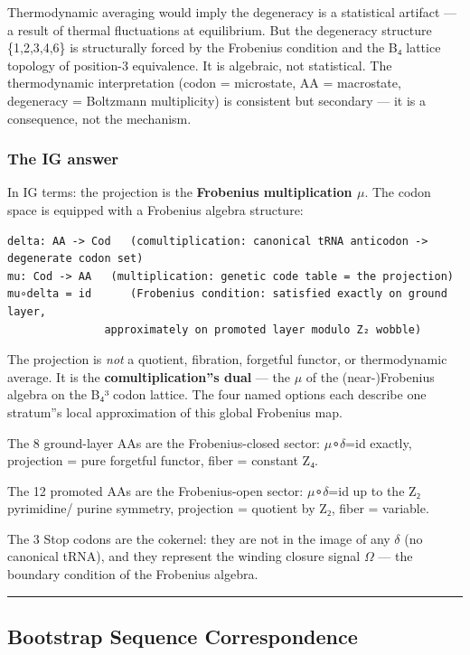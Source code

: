 \documentclass[12pt,a4paper]{article}
\begin{document}
Thermodynamic averaging would imply the degeneracy is a statistical artifact ---
a result of thermal fluctuations at equilibrium. But the degeneracy structure
\{1,2,3,4,6\} is structurally forced by the Frobenius condition and the B₄ lattice
topology of position-3 equivalence. It is algebraic, not statistical. The
thermodynamic interpretation (codon = microstate, AA = macrostate, degeneracy =
Boltzmann multiplicity) is consistent but secondary --- it is a consequence, not
the mechanism.

\subsubsection{The IG answer}

In IG terms: the projection is the \textbf{Frobenius multiplication $\mu$}. The codon space
is equipped with a Frobenius algebra structure:

\begin{lstlisting}
delta: AA -> Cod   (comultiplication: canonical tRNA anticodon -> degenerate codon set)
mu: Cod -> AA   (multiplication: genetic code table = the projection)
mu∘delta = id      (Frobenius condition: satisfied exactly on ground layer,
               approximately on promoted layer modulo Z₂ wobble)
\end{lstlisting}

The projection is \emph{not} a quotient, fibration, forgetful functor, or thermodynamic
average. It is the \textbf{comultiplication''s dual} --- the $\mu$ of the (near-)Frobenius
algebra on the B₄³ codon lattice. The four named options each describe one stratum''s
local approximation of this global Frobenius map.

The 8 ground-layer AAs are the Frobenius-closed sector: $\mu$∘$\delta$=id exactly, projection
= pure forgetful functor, fiber = constant Z₄.

The 12 promoted AAs are the Frobenius-open sector: $\mu$∘$\delta$=id up to the Z₂ pyrimidine/
purine symmetry, projection = quotient by Z₂, fiber = variable.

The 3 Stop codons are the cokernel: they are not in the image of any $\delta$ (no canonical
tRNA), and they represent the winding closure signal $\Omega$ --- the boundary condition of
the Frobenius algebra.

\begin{center}
\rule{0.5\textwidth}{0.4pt}
\end{center}

\subsection{Bootstrap Sequence Correspondence}
\end{document}
